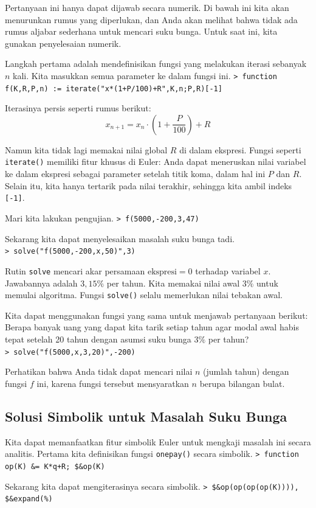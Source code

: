 \documentclass[11pt, a4paper]{article}
\newcommand{\emtcmd}[1]{\noindent\texttt{\textcolor{emtcommand}{>}\ #1}\par\smallskip}
\begin{document}
Pertanyaan ini hanya dapat dijawab secara numerik. Di bawah ini kita akan menurunkan rumus yang diperlukan, dan Anda akan melihat bahwa tidak ada rumus aljabar sederhana untuk mencari suku bunga. Untuk saat ini, kita gunakan penyelesaian numerik.

Langkah pertama adalah mendefinisikan fungsi yang melakukan iterasi sebanyak $n$ kali. Kita masukkan semua parameter ke dalam fungsi ini.
\emtcmd{function f(K,R,P,n) := iterate("x*(1+P/100)+R",K,n;P,R)[-1]}

Iterasinya persis seperti rumus berikut:
$$x_{n+1} = x_n \cdot \left(1+ \frac{P}{100}\right) + R$$

Namun kita tidak lagi memakai nilai global $R$ di dalam ekspresi. Fungsi seperti \texttt{iterate()} memiliki fitur khusus di Euler: Anda dapat meneruskan nilai variabel ke dalam ekspresi sebagai parameter setelah titik koma, dalam hal ini $P$ dan $R$. Selain itu, kita hanya tertarik pada nilai terakhir, sehingga kita ambil indeks \texttt{[-1]}.

Mari kita lakukan pengujian.
\emtcmd{f(5000,-200,3,47)}

Sekarang kita dapat menyelesaikan masalah suku bunga tadi.
\emtcmd{solve("f(5000,-200,x,50)",3)}

Rutin \texttt{solve} mencari akar persamaan $\text{ekspresi}=0$ terhadap variabel $x$. Jawabannya adalah $3,15\%$ per tahun. Kita memakai nilai awal $3\%$ untuk memulai algoritma. Fungsi \texttt{solve()} selalu memerlukan nilai tebakan awal.

Kita dapat menggunakan fungsi yang sama untuk menjawab pertanyaan berikut: Berapa banyak uang yang dapat kita tarik setiap tahun agar modal awal habis tepat setelah 20 tahun dengan asumsi suku bunga $3\%$ per tahun?
\emtcmd{solve("f(5000,x,3,20)",-200)}

Perhatikan bahwa Anda tidak dapat mencari nilai $n$ (jumlah tahun) dengan fungsi $f$ ini, karena fungsi tersebut mensyaratkan $n$ berupa bilangan bulat.

\subsection*{Solusi Simbolik untuk Masalah Suku Bunga}

Kita dapat memanfaatkan fitur simbolik Euler untuk mengkaji masalah ini secara analitis. Pertama kita definisikan fungsi \texttt{onepay()} secara simbolik.
\emtcmd{function op(K) \&= K*q+R; \$\&op(K)}

Sekarang kita dapat mengiterasinya secara simbolik.
\emtcmd{\$\&op(op(op(op(K)))), \$\&expand(\%)}
\end{document}
